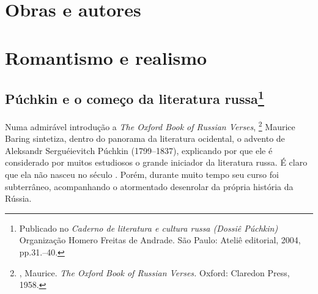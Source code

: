 \part{Obras e autores}
%

\part{Romantismo e realismo}

\chapter{Púchkin e o começo da literatura russa\footnote{Publicado no \emph{Caderno de literatura e cultura russa (Dossiê Púchkin)} Organização Homero Freitas de Andrade. São Paulo: Ateliê editorial, 2004, pp.31.--40.}}

Numa admirável introdução a \emph{The Oxford Book of Russian Verses}, \footnote{, Maurice. \emph{The Oxford Book of Russian Verses.} Oxford: Claredon Press, 1958.}
Maurice Baring sintetiza, dentro do panorama da literatura ocidental, o
advento de Aleksandr Serguéievitch Púchkin (1799--1837), explicando por
que ele é considerado por muitos estudiosos o grande iniciador da
literatura russa. É claro que ela não nasceu no século . Porém, durante muito tempo seu curso foi subterrâneo, acompanhando o atormentado
desenrolar da própria história da Rússia.

